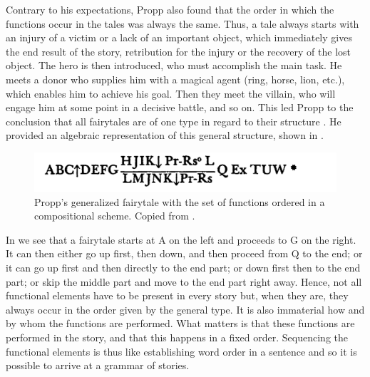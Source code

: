 \documentclass[output=paper]{langscibook}
\begin{document}
Contrary to his expectations, Propp also found that the order in which the functions occur in the tales was always the same. Thus, a tale always starts with an injury of a victim or a lack of an important object, which immediately gives the end result of the story, retribution for the injury or the recovery of the lost object. The hero is then introduced, who must accomplish the main task. He meets a donor who supplies him with a magical agent (ring, horse, lion, etc.), which enables him to achieve his goal. Then they meet the villain, who will engage him at some point in a decisive battle, and so on. This led Propp to the conclusion that all fairytales are of one type in regard to their structure \citep[23]{Propp1968}. He provided an algebraic representation of this general structure, shown in .

\begin{figure} 
    \includegraphics[width=\textwidth]{figures/Propp.png}
    \caption{Propp's generalized fairytale with the set of functions ordered in a compositional scheme. Copied from \cite[105]{Propp1968}.}
    \label{fig:karstens:proppfairytale}
\end{figure}

In  we see that a fairytale starts at A on the left and proceeds to G on the right. It can then either go up first, then down, and then proceed from Q to the end; or it can go up first and then directly to the end part; or down first then to the end part; or skip the middle part and move to the end part right away. Hence, not all functional elements have to be present in every story but, when they are, they always occur in the order given by the general type. It is also immaterial how and by whom the functions are performed. What matters is that these functions are performed in the story, and that this happens in a fixed order. Sequencing the functional elements is thus like establishing word order in a sentence and so it is possible to arrive at a grammar of stories. 
\end{document}
